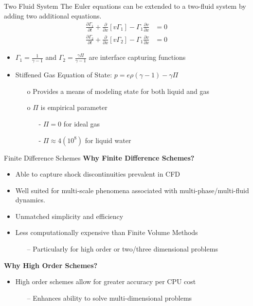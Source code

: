 \documentclass[9pt]{beamer}
\begin{document}
\begin{frame}{Two Fluid System}
  The Euler equations can be extended to a two-fluid system by adding two additional equations.
  \begin{align}
    \frac{\partial \Gamma_1 }{\partial t} + \frac{\partial}{\partial x}[v\Gamma_1] - \Gamma_1 \frac{\partial v}{\partial x}&=0\label{eq: Order Parameter One}\\
    \frac{\partial \Gamma_2 }{\partial t} + \frac{\partial}{\partial x}[v\Gamma_2] - \Gamma_1 \frac{\partial v}{\partial x}&=0\label{eq: Order Parameter Two}
  \end{align}

  \begin{itemize}
    \item $\Gamma_1 = \frac{1}{\gamma -1}$ and $\Gamma_2 = \frac{\gamma \Pi}{\gamma -1}$ are interface capturing functions
    \item Stiffened Gas Equation of State: $p = e\rho(\gamma - 1) -\gamma \Pi$
    \begin{itemize}
      \item[o] Provides a means of modeling state for both liquid and gas 
      \item[o] $\Pi$ is empirical parameter
      \begin{itemize}
        \item [-] $\Pi = 0$ for ideal gas
        \item [-] $\Pi \approx 4(10^8)$ for liquid water
      \end{itemize}    
    \end{itemize}
  \end{itemize}

\end{frame}


\begin{frame}{Finite Difference Schemes}
\textbf{Why Finite Difference Schemes?}
\begin{itemize}
\item Able to capture shock discontinuities prevalent in CFD
\item Well suited for multi-scale phenomena associated with multi-phase/multi-fluid dynamics.
\item Unmatched simplicity and efficiency
\item Less computationally expensive than Finite Volume Methods
\begin{itemize}
\item[--] Particularly for high order or two/three dimensional problems \cite{FVFDComparison}
\end{itemize}
\end{itemize}
\textbf{Why High Order Schemes?}
\begin{itemize}
\item High order schemes allow for greater accuracy per CPU cost
\begin{itemize}
\item[--] Enhances ability to solve multi-dimensional problems
\end{itemize}
\end{itemize}
\end{frame}
\end{document}
